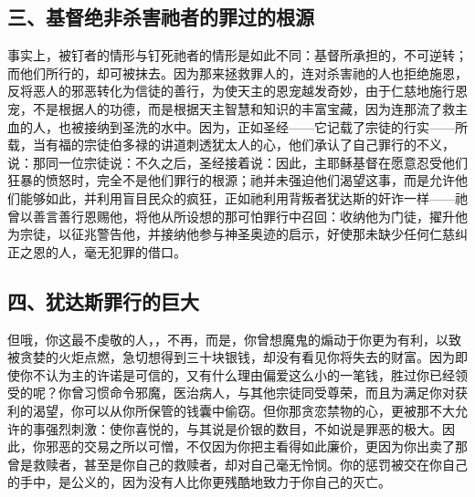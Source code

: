 
\subsection{三、基督绝非杀害祂者的罪过的根源}

事实上，被钉者的情形与钉死祂者的情形是如此不同：基督所承担的，不可逆转；而他们所行的，却可被抹去。因为那来拯救罪人的，连对杀害祂的人也拒绝施恩，反将恶人的邪恶转化为信徒的善行，为使天主的恩宠越发奇妙，由于仁慈地施行恩宠，不是根据人的功德，而是根据天主智慧和知识的丰富宝藏，因为连那流了救主血的人，也被接纳到圣洗的水中。因为，正如圣经——它记载了宗徒的行实——所载，当有福的宗徒伯多禄的讲道刺透犹太人的心，他们承认了自己罪行的不义，说：那同一位宗徒说：不久之后，圣经接着说：因此，主耶稣基督在愿意忍受他们狂暴的愤怒时，完全不是他们罪行的根源；祂并未强迫他们渴望这事，而是允许他们能够如此，并利用盲目民众的疯狂，正如祂利用背叛者犹达斯的奸诈一样——祂曾以善言善行恩赐他，将他从所设想的那可怕罪行中召回：收纳他为门徒，擢升他为宗徒，以征兆警告他，并接纳他参与神圣奥迹的启示，好使那未缺少任何仁慈纠正之恩的人，毫无犯罪的借口。\par


\subsection{四、犹达斯罪行的巨大}

但哦，你这最不虔敬的人，，不再，而是，你曾想魔鬼的煽动于你更为有利，以致被贪婪的火炬点燃，急切想得到三十块银钱，却没有看见你将失去的财富。因为即使你不认为主的许诺是可信的，又有什么理由偏爱这么小的一笔钱，胜过你已经领受的呢？你曾习惯命令邪魔，医治病人，与其他宗徒同受尊荣，而且为满足你对获利的渴望，你可以从你所保管的钱囊中偷窃。但你那贪恋禁物的心，更被那不大允许的事强烈刺激：使你喜悦的，与其说是价银的数目，不如说是罪恶的极大。因此，你邪恶的交易之所以可憎，不仅因为你把主看得如此廉价，更因为你出卖了那曾是救赎者，甚至是你自己的救赎者，却对自己毫无怜悯。你的惩罚被交在你自己的手中，是公义的，因为没有人比你更残酷地致力于你自己的灭亡。\par

